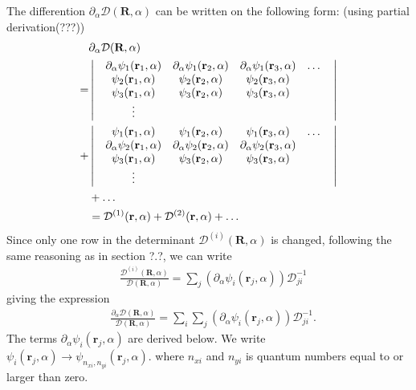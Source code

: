 \documentclass[a4paper,10pt,twocolumn]{article} %
\newcommand{\ts}[1]{\textbf{#1}}
\begin{document}
\begin{appendix}
The differention $\partial_\alpha \mathcal D(\ts R,\alpha)$ can be written on the following form: (using partial derivation(???))
\begin{align}
	&\partial_\alpha\mathcal D(\ts R,\alpha)  \notag\\
=&\left|
\begin{matrix}
	& \partial_\alpha\psi_1(\ts r_1,\alpha) & \partial_\alpha\psi_1(\ts r_2,\alpha) & \partial_\alpha\psi_1(\ts r_3,\alpha) &\dots & \\
	& \psi_2(\ts r_1,\alpha) & \psi_2(\ts r_2,\alpha) & \psi_2(\ts r_3,\alpha) & & \\
	& \psi_3(\ts r_1,\alpha) & \psi_3(\ts r_2,\alpha) & \psi_3(\ts r_3,\alpha) & & \\
	& \vdots & & & & %
\end{matrix}\right|\notag\\
+&\left|
\begin{matrix}
	& \psi_1(\ts r_1,\alpha) & \psi_1(\ts r_2,\alpha) & \psi_1(\ts r_3,\alpha) &\dots & \\
	& \partial_\alpha\psi_2(\ts r_1,\alpha) & \partial_\alpha\psi_2(\ts r_2,\alpha) & \partial_\alpha\psi_2(\ts r_3,\alpha) & & \\
	& \psi_3(\ts r_1,\alpha) & \psi_3(\ts r_2,\alpha) & \psi_3(\ts r_3,\alpha) & & \\
	& \vdots & & & & %
\end{matrix}
\right|\notag\\
&+\dots \\
&=\mathcal D^{(1)}(\ts r,\alpha)+\mathcal D^{(2)}(\ts r,\alpha)+\dots
\end{align}
Since only one row in the determinant $\mathcal D^{(i)}(\ts R,\alpha)$ is changed, following the same reasoning as in section ?.?, we can write
\begin{align}
&\frac{\mathcal D^{(i)}(\ts R,\alpha)}{\mathcal D(\ts R,\alpha)}=\sum_j(\partial_\alpha \psi_i(\ts r_j,\alpha)) \mathcal D^{-1}_{ji}
\end{align}
giving the expression
\begin{align} 
&\frac{\partial_\alpha \mathcal D(\ts R,\alpha)}{\mathcal D(\ts R,\alpha)}=\sum_i\sum_j(\partial_\alpha \psi_i(\ts r_j,\alpha)) \mathcal D^{-1}_{ji}.
\end{align}
The terms $\partial_\alpha \psi_i(\ts r_j,\alpha)$ are derived below. 
We write $\psi_i(\ts r_j,\alpha)\to\psi_{n_{xi},n_{yi}}(\ts r_j,\alpha)$. where $n_{xi}$ and $n_{yi}$ is quantum numbers equal to or larger than zero. 

\end{appendix}
\end{document}
